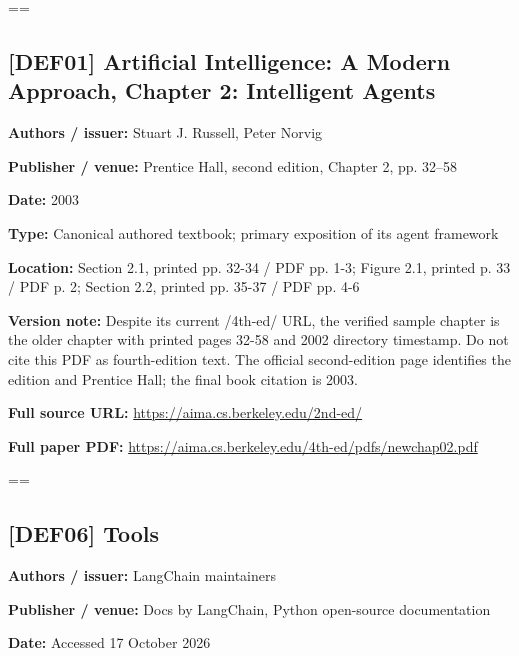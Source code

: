 \documentclass[10pt,letterpaper]{article}
\begin{document}
\egroup\par\noindent\box\readingEntry\par\medskip
\setbox\readingEntry=\vbox\bgroup\hsize=\linewidth\subsection*{[DEF01] Artificial Intelligence: A Modern Approach, Chapter 2: Intelligent Agents}
\textbf{Authors / issuer:} Stuart J. Russell, Peter Norvig\par
\textbf{Publisher / venue:} Prentice Hall, second edition, Chapter 2, pp. 32--58\par
\textbf{Date:} 2003\par
\textbf{Type:} Canonical authored textbook; primary exposition of its agent framework\par
\textbf{Location:} Section 2.1, printed pp. 32-34 / PDF pp. 1-3; Figure 2.1, printed p. 33 / PDF p. 2; Section 2.2, printed pp. 35-37 / PDF pp. 4-6\par
\textbf{Version note:} Despite its current /4th-ed/ URL, the verified sample chapter is the older chapter with printed pages 32-58 and 2002 directory timestamp. Do not cite this PDF as fourth-edition text. The official second-edition page identifies the edition and Prentice Hall; the final book citation is 2003.\par
\textbf{Full source URL:} \href{https://aima.cs.berkeley.edu/2nd-ed/}{\small\ttfamily https:/\allowbreak{}/\allowbreak{}aima.\allowbreak{}cs.\allowbreak{}berkeley.\allowbreak{}edu/\allowbreak{}2nd-\allowbreak{}ed/\allowbreak{}}\par
\textbf{Full paper PDF:} \href{https://aima.cs.berkeley.edu/4th-ed/pdfs/newchap02.pdf}{\small\ttfamily https:/\allowbreak{}/\allowbreak{}aima.\allowbreak{}cs.\allowbreak{}berkeley.\allowbreak{}edu/\allowbreak{}4th-\allowbreak{}ed/\allowbreak{}pdfs/\allowbreak{}newchap02.\allowbreak{}pdf}\par
\egroup\par\noindent\box\readingEntry\par\medskip
\setbox\readingEntry=\vbox\bgroup\hsize=\linewidth\subsection*{[DEF06] Tools}
\textbf{Authors / issuer:} LangChain maintainers\par
\textbf{Publisher / venue:} Docs by LangChain, Python open-source documentation\par
\textbf{Date:} Accessed 17 October 2026\par
\end{document}

